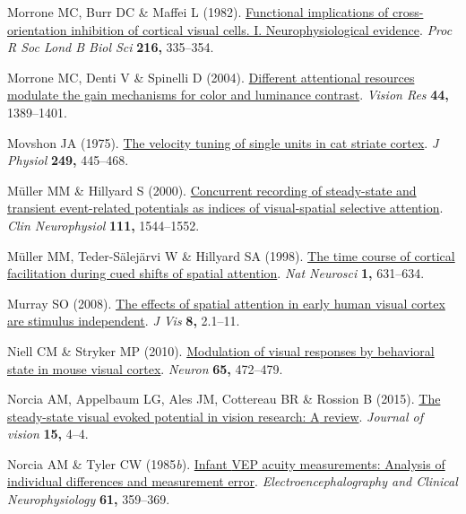 \documentclass[
  letterpaper,
  DIV=11,
  numbers=noendperiod]{scrartcl}
\newlength{\cslhangindent}
\newenvironment{CSLReferences}[2] %
 {\begin{list}{}{%
  \setlength{\itemindent}{0pt}
  \setlength{\leftmargin}{0pt}
  \setlength{\parsep}{0pt}
  \ifodd #1
   \setlength{\leftmargin}{\cslhangindent}
   \setlength{\itemindent}{-1\cslhangindent}
  \fi
  \setlength{\itemsep}{#2\baselineskip}}}
 {\end{list}}
\begin{document}
\begin{CSLReferences}{1}{1}
Morrone MC, Burr DC \& Maffei L (1982).
\href{https://doi.org/10.1098/rspb.1982.0078}{Functional implications of
cross-orientation inhibition of cortical visual cells. I.
Neurophysiological evidence}. \emph{Proc R Soc Lond B Biol Sci}
\textbf{216,} 335--354.

Morrone MC, Denti V \& Spinelli D (2004).
\href{https://doi.org/10.1016/j.visres.2003.10.014}{Different
attentional resources modulate the gain mechanisms for color and
luminance contrast}. \emph{Vision Res} \textbf{44,} 1389--1401.

Movshon JA (1975).
\href{https://doi.org/10.1113/jphysiol.1975.sp011025}{The velocity
tuning of single units in cat striate cortex}. \emph{J Physiol}
\textbf{249,} 445--468.

Müller MM \& Hillyard S (2000).
\href{https://doi.org/10.1016/s1388-2457(00)00371-0}{Concurrent
recording of steady-state and transient event-related potentials as
indices of visual-spatial selective attention}. \emph{Clin Neurophysiol}
\textbf{111,} 1544--1552.

Müller MM, Teder-Sälejärvi W \& Hillyard SA (1998).
\href{https://doi.org/10.1038/2865}{The time course of cortical
facilitation during cued shifts of spatial attention}. \emph{Nat
Neurosci} \textbf{1,} 631--634.

Murray SO (2008). \href{https://doi.org/10.1167/8.10.2}{The effects of
spatial attention in early human visual cortex are stimulus
independent}. \emph{J Vis} \textbf{8,} 2.1--11.

Niell CM \& Stryker MP (2010).
\href{https://doi.org/10.1016/j.neuron.2010.01.033}{Modulation of visual
responses by behavioral state in mouse visual cortex}. \emph{Neuron}
\textbf{65,} 472--479.

Norcia AM, Appelbaum LG, Ales JM, Cottereau BR \& Rossion B (2015).
\href{https://doi.org/10.1167/15.6.4}{The steady-state visual evoked
potential in vision research: {A} review}. \emph{Journal of vision}
\textbf{15,} 4--4.

Norcia AM \& Tyler CW (1985\emph{b}).
\href{https://doi.org/10.1016/0013-4694(85)91026-0}{Infant {VEP} acuity
measurements: Analysis of individual differences and measurement error}.
\emph{Electroencephalography and Clinical Neurophysiology} \textbf{61,}
359--369.


\end{CSLReferences}
\end{document}
